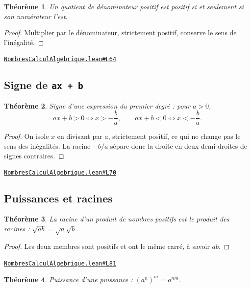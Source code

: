 \documentclass[11pt,a4paper]{article}
\theoremstyle{definition}
\theoremstyle{plain}
\newtheorem{theoreme}{Théorème}
\newcommand{\source}[2]{\par\smallskip\noindent\hfill{\footnotesize\href{#1}{\texttt{#2}}}\par\smallskip}
\begin{document}
\begin{theoreme}
Un quotient de dénominateur positif est positif si et seulement si son numérateur
l'est.
\end{theoreme}

\begin{proof}
Multiplier par le dénominateur, strictement positif, conserve le sens de
l'inégalité.
\end{proof}
\source{https://github.com/Commutator-IO/learn-lean/blob/main/courses/02-lycee/01-nombres-calcul-algebrique/NombresCalculAlgebrique.lean\#L64}{NombresCalculAlgebrique.lean\#L64}

\subsection{Signe de \texttt{ax + b}}

\begin{theoreme}
Signe d'une expression du premier degré : pour $a > 0$,
\[ ax + b > 0 \iff x > -\frac{b}{a}, \qquad ax + b < 0 \iff x < -\frac{b}{a} . \]
\end{theoreme}

\begin{proof}
On isole $x$ en divisant par $a$, strictement positif, ce qui ne change pas le sens des
inégalités. La racine $-b/a$ sépare donc la droite en deux demi-droites de signes
contraires.
\end{proof}
\source{https://github.com/Commutator-IO/learn-lean/blob/main/courses/02-lycee/01-nombres-calcul-algebrique/NombresCalculAlgebrique.lean\#L70}{NombresCalculAlgebrique.lean\#L70}

\subsection{Puissances et racines}

\begin{theoreme}
La racine d'un produit de nombres positifs est le produit des racines :
$\sqrt{ab} = \sqrt a \sqrt b$.
\end{theoreme}

\begin{proof}
Les deux membres sont positifs et ont le même carré, à savoir $ab$.
\end{proof}
\source{https://github.com/Commutator-IO/learn-lean/blob/main/courses/02-lycee/01-nombres-calcul-algebrique/NombresCalculAlgebrique.lean\#L81}{NombresCalculAlgebrique.lean\#L81}

\begin{theoreme}
Puissance d'une puissance : $(a^n)^m = a^{nm}$.
\end{theoreme}
\end{document}
